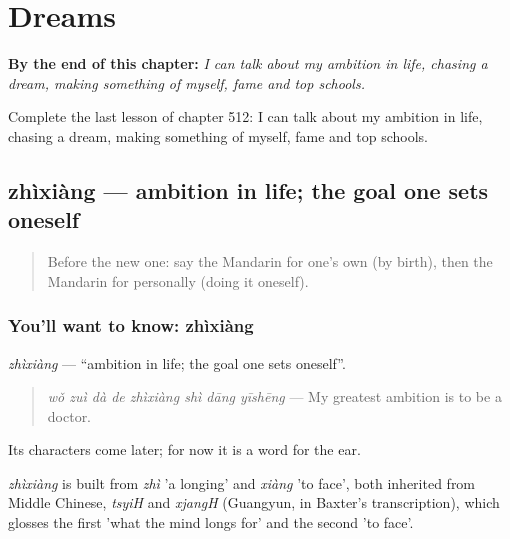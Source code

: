 
\chapter{Dreams}
\label{ch:zh-dreams}

\begin{chapteropening}
\textbf{By the end of this chapter:} \emph{I can talk about my ambition in life, chasing a dream, making something of myself, fame and top schools.}

Complete the last lesson of chapter 512: I can talk about my ambition in life, chasing a dream, making something of myself, fame and top schools.
\end{chapteropening}

\section[zhìxiàng]{zhìxiàng — ambition in life; the goal one sets oneself}

\label{lesson:ZH-C512-zhixiang}



\begin{quote}
Before the new one: say the Mandarin for one's own (by birth), then the Mandarin for personally (doing it oneself).
\end{quote}

\subsection*{You'll want to know: zhìxiàng}
\emph{zhìxiàng} — \textquotedblleft{}ambition in life; the goal one sets oneself\textquotedblright{}.

\begin{quote}
\emph{wǒ zuì dà de zhìxiàng shì dāng yīshēng} — My greatest ambition is to be a doctor.
\end{quote}

Its characters come later; for now it is a word for the ear.

\begin{cousinweb}
\emph{zhìxiàng} is built from \emph{zhì} 'a longing' and \emph{xiàng} 'to face', both inherited from Middle Chinese, \emph{tsyiH} and \emph{xjangH} (Guangyun, in Baxter's transcription), which glosses the first 'what the mind longs for' and the second 'to face'.
\end{cousinweb}

